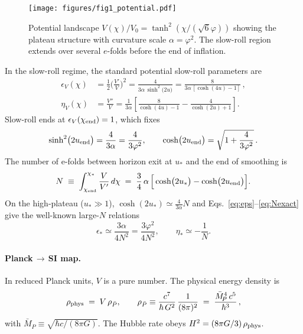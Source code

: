 \documentclass[11pt]{article}
\theoremstyle{definition}
\theoremstyle{remark}
\begin{document}
\begin{figure}[htbp]
\centering
\texttt{[image: figures/fig1\_potential.pdf]}
\caption{Potential landscape \(V(\chi)/V_0 = \tanh^2(\chi/(\sqrt{6}\varphi))\) showing the plateau structure with curvature scale \(\alpha=\varphi^2\). The slow-roll region extends over several \(e\)-folds before the end of inflation.}
\label{fig:potential}
\end{figure} In the slow-roll regime, the standard potential slow-roll parameters are
\begin{align}
  \epsilon_V(\chi)
  &= \frac12\Big(\frac{V'}{V}\Big)^2
   = \frac{4}{3\alpha\,\sinh^2\!\big(2u\big)}
   = \frac{8}{3\alpha\,[\cosh(4u)-1]}\,,
   \label{eq:eps}\\
  \eta_V(\chi)
  &= \frac{V''}{V}
   = \frac{1}{3\alpha}\!\left[\frac{8}{\cosh(4u)-1}
                            -\frac{4}{\cosh(2u)+1}\right].
   \label{eq:eta}
\end{align}
Slow-roll ends at \(\epsilon_V(\chi_{\rm end})=1\), which fixes
\begin{equation}
  \sinh^2\!\big(2u_{\rm end}\big)=\frac{4}{3\alpha}=\frac{4}{3\varphi^2},
  \qquad
  \cosh\!\big(2u_{\rm end}\big)=\sqrt{1+\frac{4}{3\varphi^2}}\,.
  \label{eq:end}
\end{equation}
The number of e-folds between horizon exit at \(u_*\) and the end of smoothing is
\begin{equation}
  N \;\equiv\; \int_{\chi_{\rm end}}^{\chi_*}\frac{V}{V'}\,d\chi
  \;=\; \frac{3}{4}\,\alpha\,\Big[\cosh\!\big(2u_*\big)-\cosh\!\big(2u_{\rm end}\big)\Big].
  \label{eq:Nexact}
\end{equation}
On the high-plateau (\(u_*\gg 1\)), \(\cosh(2u_*)\simeq \tfrac{4}{3\alpha}N\) and Eqs.~\eqref{eq:eps}–\eqref{eq:Nexact} give the well-known large-\(N\) relations
\begin{equation}
  \epsilon_{*}\simeq \frac{3\alpha}{4N^2}=\frac{3\varphi^2}{4N^2},
  \qquad
  \eta_{*}\simeq -\frac{1}{N}.
  \label{eq:plateau-approx}
\end{equation}
\paragraph{Planck\(\,\to\,\)SI map.}
In reduced Planck units, \(V\) is a pure number. The physical energy density is
\begin{equation}
  \rho_{\rm phys} \;=\; V \,\rho_{\bar P}, 
  \qquad \rho_{\bar P}\equiv \frac{c^7}{\hbar\,G^2}\,\frac{1}{(8\pi)^2}
  \;=\; \frac{\bar M_{\!P}^4\,c^5}{\hbar^3}\,,
  \label{eq:rhoSI}
\end{equation}
with \(\bar M_{\!P}\equiv \sqrt{\hbar c/(8\pi G)}\). The Hubble rate obeys \(H^2=(8\pi G/3)\,\rho_{\rm phys}\).
\end{document}
